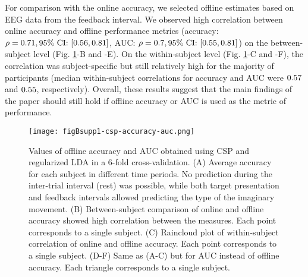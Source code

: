 \medskip

For comparison with the online accuracy, we selected offline estimates based on EEG data from the feedback interval. We observed high correlation between online accuracy and offline performance metrics (accuracy: $\rho = 0.71, 95\%~\text{CI:}~[0.56, 0.81]$, AUC: $\rho = 0.7, 95\%~\text{CI:}~[0.55, 0.81]$) on the between-subject level (Fig. \ref{fig:csp_accuracy_auc}-B and -E). On the within-subject level (Fig. \ref{fig:csp_accuracy_auc}-C and -F), the correlation was subject-specific but still relatively high for the majority of participants (median within-subject correlations for accuracy and AUC were $0.57$ and $0.55$, respectively). Overall, these results suggest that the main findings of the paper should still hold if offline accuracy or AUC is used as the metric of performance.

\medskip

\begin{table}[htbp]
    \centering
    \cspGroupTTestSummary
    \caption{Summary of the observed differences between CSP-based ('Mean' column) and chance level (0.5) values of accuracy and AUC in three time windows of interest (rest: [0.49, 1.99] s of the inter-trial interval, target: [0.49, 1.99] s of the target presentation interval, feedback: [-1.51, -0.01] s relative to the end of the feedback interval). Significant p-values are highlighted in bold, and stars indicate that the differences remained significant after Bonferroni correction for multiple ($m$ = 3) comparisons due to considering three time windows.}
    \label{tab:csp_group_ttest}
\end{table}

\begin{figure}[htbp]
    \centering
    \texttt{[image: figBsupp1-csp-accuracy-auc.png]}
    \caption{Values of offline accuracy and AUC obtained using CSP and regularized LDA in a 6-fold cross-validation. (A) Average accuracy for each subject in different time periods. No prediction during the inter-trial interval (rest) was possible, while both target presentation and feedback intervals allowed predicting the type of the imaginary movement. (B) Between-subject comparison of online and offline accuracy showed high correlation between the measures. Each point corresponds to a single subject. (C) Raincloud plot of within-subject correlation of online and offline accuracy. Each point corresponds to a single subject. (D-F) Same as (A-C) but for AUC instead of offline accuracy. Each triangle corresponds to a single subject.}
    \label{fig:csp_accuracy_auc}
\end{figure}

